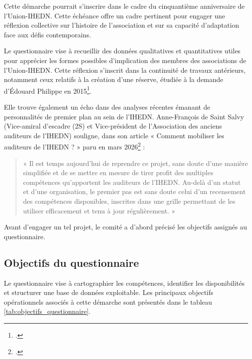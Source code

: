 \documentclass[12pt,a4paper]{article}
\newcommand{\UnionIHEDN}{Union-IHEDN}
\newcommand{\AssociationsUnionIHEDN}{associations de l'\UnionIHEDN}
\begin{document}
Cette démarche pourrait s'inscrire dans le cadre du cinquantième anniversaire de l'\UnionIHEDN. Cette échéance offre un cadre pertinent pour engager une réflexion collective sur l'histoire de l'association et sur sa capacité d'adaptation face aux défis contemporains.

Le questionnaire vise à recueillir des données qualitatives et quantitatives utiles pour apprécier les formes possibles d'implication des membres des \AssociationsUnionIHEDN. Cette réflexion s'inscrit dans la continuité de travaux antérieurs, notamment ceux relatifs à la création d'une réserve, étudiée à la demande d'Édouard Philippe en 2015\footcite{DESAINTSALVY2026}.

Elle trouve également un écho dans des analyses récentes émanant de personnalités de premier plan au sein de l'IHEDN. Anne-François de Saint Salvy (Vice-amiral d'escadre (2S) et Vice-président de l'Association des anciens auditeurs de l'IHEDN) souligne, dans son article « Comment mobiliser les auditeurs de l'IHEDN ? » paru en mars 2026\footcite{DESAINTSALVY2026} :

\begin{quote}
« Il est temps aujourd'hui de reprendre ce projet, sans doute d'une manière simplifiée et de se mettre en mesure de tirer profit des multiples compétences qu'apportent les auditeurs de l'IHEDN. Au-delà d'un statut et d'une organisation, le premier pas est sans doute celui d'un recensement des compétences disponibles, inscrites dans une grille permettant de les utiliser efficacement et tenu à jour régulièrement. »
\end{quote}

Avant d'engager un tel projet, le comité a d'abord précisé les objectifs assignés au questionnaire.

\clearpage

\subsection{Objectifs du questionnaire}

Le questionnaire vise à cartographier les compétences, identifier les disponibilités et structurer une base de données exploitable. Les principaux objectifs opérationnels associés à cette démarche sont présentés dans le tableau \ref{tab:objectifs_questionnaire}.
\end{document}
